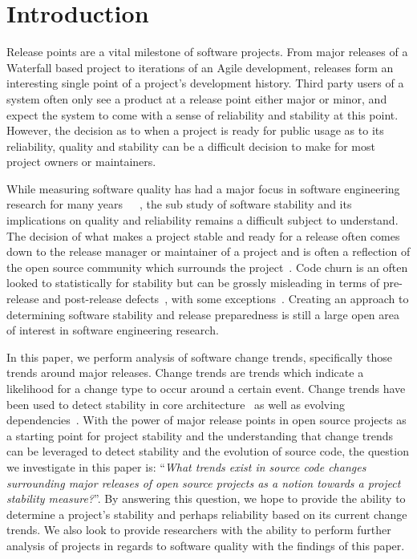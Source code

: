 \documentclass{sig-alternate}
\begin{document}

\section{Introduction}
Release points are a vital milestone of software projects. From major releases of a Waterfall based project to iterations of an Agile development,
releases form an interesting single point of a project's development history.
Third party users of a system often only see a product at a release point either major or minor,
and expect the system to come with a sense of reliability and stability at this point. However, the decision as to when a project is ready for public usage
as to its reliability, quality and stability can be a difficult decision to make for most project owners or maintainers.

While measuring software quality has had a major focus in software engineering research for many years~\cite{Bowen:1978:CAS}~\cite{Grady:1993:PRM}~\cite{ISOIEC9126},
the sub study of software stability and its implications on quality and reliability remains a difficult subject to understand. 
The decision of what makes a project stable and ready
for a release often comes down to the release manager or maintainer of a project and is often a reflection of the open source community which surrounds 
the project~\cite{Conway:1968}. Code churn is an often looked to statistically for stability but can be grossly misleading
in terms of pre-release and post-release defects~\cite{Fenton:2000:QAF}, with some exceptions~\cite{Nagappan:2005:URC}. 
Creating an approach to determining software stability and release preparedness is still a large open area of
interest in software engineering research.

In this paper, we perform analysis of software change trends, specifically those trends around major releases. Change trends are trends which indicate
a likelihood for a change type to occur around a certain event. Change trends have been used to detect
stability in core architecture~\cite{Wermelinger:2008:AEE} as well as evolving dependencies~\cite{Businge:2010:ESE}.
With the power of major release points in open source projects as a starting point for project stability and the understanding that change trends can
be leveraged to detect stability and the evolution of source code, the question we investigate in this paper is:
``\textit{What trends exist in source code changes surrounding major releases of open source projects as a notion towards a project
stability measure?}''. By answering this question, we hope to provide the ability to determine a project's stability and perhaps
reliability based on its current change trends. We also look to provide researchers with the ability to perform further analysis of projects in
regards to software quality with the findings of this paper.
\end{document}
